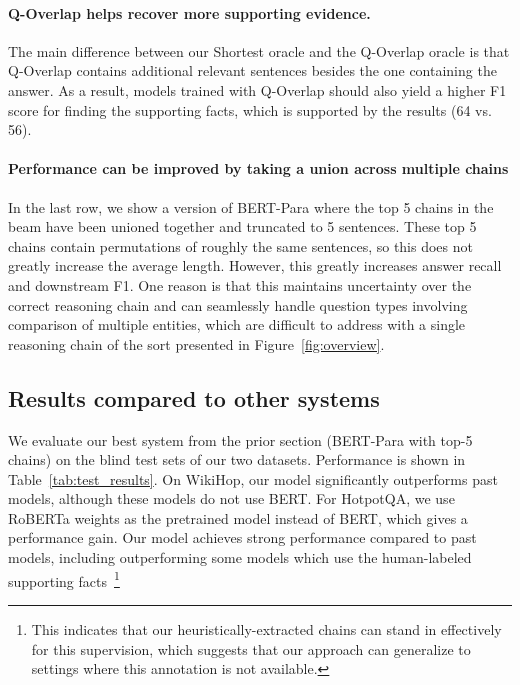 \documentclass[11pt,a4paper]{article}
\begin{document}
\paragraph{Q-Overlap helps recover more supporting evidence.} The main difference between our Shortest oracle and the Q-Overlap oracle is that Q-Overlap contains additional relevant sentences besides the one containing the answer. As a result, models trained with Q-Overlap should also yield a higher F1 score for finding the supporting facts, which is supported by the results (64 vs. 56).

\paragraph{Performance can be improved by taking a union across multiple chains} In the last row, we show a version of BERT-Para where the top 5 chains in the beam have been unioned together and truncated to 5 sentences. These top 5 chains contain permutations of roughly the same sentences, so this does not greatly increase the average length. However, this greatly increases answer recall and downstream F1. One reason is that this maintains uncertainty over the correct reasoning chain and can seamlessly handle question types involving comparison of multiple entities, which are difficult to address with a single reasoning chain of the sort presented in Figure~\ref{fig:overview}.

\subsection{Results compared to other systems}
We evaluate our best system from the prior section (BERT-Para with top-5 chains) on the blind test sets of our two datasets. Performance is shown in Table~\ref{tab:test_results}. On WikiHop, our model significantly outperforms past models, although these models do not use BERT. For HotpotQA, we use RoBERTa \citep{roberta} weights as the pretrained model instead of BERT, which gives a performance gain. Our model achieves strong performance compared to past models, including outperforming some models which use the human-labeled supporting facts~\footnote{This indicates that our heuristically-extracted chains can stand in effectively for this supervision, which suggests that our approach can generalize to settings where this annotation is not available.}
\end{document}
